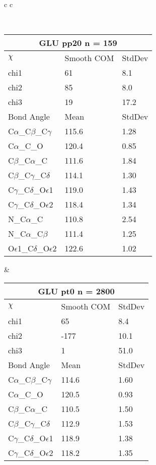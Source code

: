 \begin{longtable}{ c c }

\caption{GLU Central Values}\\
  \begin{tabular}{ l l l }
  \toprule
  \multicolumn{3}{c}{GLU \textbf{pp20} n = 159} \\ \toprule
  $\chi$       & Smooth COM & StdDev \\ \midrule
  chi1 & 61 & 8.1 \\ 
  chi2 & 85 & 8.0 \\ 
  chi3 & 19 & 17.2 \\ \midrule
  Bond Angle   & Mean     & StdDev \\ \midrule
  C$\alpha$\_C$\beta$\_C$\gamma$ & 115.6 & 1.28\\
  C$\alpha$\_C\_O & 120.4 & 0.85\\
  C$\beta$\_C$\alpha$\_C & 111.6 & 1.84\\
  C$\beta$\_C$\gamma$\_C$\delta$ & 114.1 & 1.30\\
  C$\gamma$\_C$\delta$\_O$\epsilon$1 & 119.0 & 1.43\\
  C$\gamma$\_C$\delta$\_O$\epsilon$2 & 118.4 & 1.34\\
  N\_C$\alpha$\_C & 110.8 & 2.54\\
  N\_C$\alpha$\_C$\beta$ & 111.4 & 1.25\\
  O$\epsilon$1\_C$\delta$\_O$\epsilon$2 & 122.6 & 1.02\\
  \bottomrule
  \end{tabular}
  &
  \begin{tabular}{ l l l }
  \toprule
  \multicolumn{3}{c}{GLU \textbf{pt0} n = 2800} \\ \toprule
  $\chi$       & Smooth COM & StdDev \\ \midrule
  chi1 & 65 & 8.4 \\ 
  chi2 & -177 & 10.1 \\ 
  chi3 & 1 & 51.0 \\ \midrule
  Bond Angle   & Mean     & StdDev \\ \midrule
  C$\alpha$\_C$\beta$\_C$\gamma$ & 114.6 & 1.60\\
  C$\alpha$\_C\_O & 120.5 & 0.93\\
  C$\beta$\_C$\alpha$\_C & 110.5 & 1.50\\
  C$\beta$\_C$\gamma$\_C$\delta$ & 112.9 & 1.53\\
  C$\gamma$\_C$\delta$\_O$\epsilon$1 & 118.9 & 1.38\\
  C$\gamma$\_C$\delta$\_O$\epsilon$2 & 118.2 & 1.35\\

\end{tabular}
\end{longtable}
